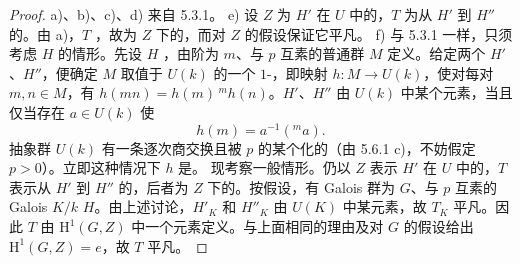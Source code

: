 \begin{proof}
a)、b)、c)、d) 来自 5.3.1。
e) 设 $Z$ 为 $H'$ 在 $U$ 中的，$T$ 为从 $H'$ 到 $H''$ 的。由 a)，$T$ ，故为 $Z$ 下的，而对 $Z$ 的假设保证它平凡。
f) 与 5.3.1 一样，只须考虑 $H$ 的情形。先设 $H$ ，由阶为 $m$、与 $p$ 互素的普通群 $M$ 定义。给定两个 $H'$、$H''$，便确定 $M$ 取值于 $U(k)$ 的一个 $1$-，即映射 $h:M\to U(k)$，使对每对 $m,n\in M$，有 $h(mn)=h(m)\,{}^mh(n)$。$H'$、$H''$ 由 $U(k)$ 中某个元素，当且仅当存在 $a\in U(k)$ 使
\[h(m)=a^{-1}({}^ma).\]
抽象群 $U(k)$ 有一条逐次商交换且被 $p$ 的某个化的（由 5.6.1 c)，不妨假定 $p>0$）。立即这种情况下 $h$ 是。
现考察一般情形。仍以 $Z$ 表示 $H'$ 在 $U$ 中的，$T$ 表示从 $H'$ 到 $H''$ 的，后者为 $Z$ 下的。按假设，有 Galois 群为 $G$、与 $p$ 互素的 Galois  $K/k$  $H$。由上述讨论，$H'_K$ 和 $H''_K$ 由 $U(K)$ 中某元素，故 $T_K$ 平凡。因此 $T$ 由 $\mathrm H^1(G,Z)$ 中一个元素定义。与上面相同的理由及对 $G$ 的假设给出 $\mathrm H^1(G,Z)=e$，故 $T$ 平凡。
\end{proof}

